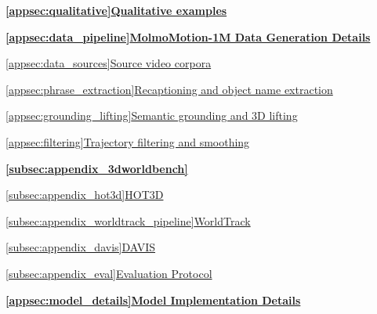 \begingroup
\hypersetup{hidelinks}
{\setlength{\parindent}{0pt}
\setlength{\parskip}{2pt}

\hyperref[appsec:qualitative]{\textbf{\ref*{appsec:qualitative}\quad Qualitative examples}}\dotfill\pageref{appsec:qualitative}


\hyperref[appsec:data_pipeline]{\textbf{\ref*{appsec:data_pipeline}\quad MolmoMotion-1M Data Generation Details}}\dotfill\pageref{appsec:data_pipeline}

\hspace*{2em}\hyperref[appsec:data_sources]{\ref*{appsec:data_sources}\quad Source video corpora}\dotfill\pageref{appsec:data_sources}

\hspace*{2em}\hyperref[appsec:phrase_extraction]{\ref*{appsec:phrase_extraction}\quad Recaptioning and object name extraction}\dotfill\pageref{appsec:phrase_extraction}

\hspace*{2em}\hyperref[appsec:grounding_lifting]{\ref*{appsec:grounding_lifting}\quad Semantic grounding and 3D lifting}\dotfill\pageref{appsec:grounding_lifting}

\hspace*{2em}\hyperref[appsec:filtering]{\ref*{appsec:filtering}\quad Trajectory filtering and smoothing}\dotfill\pageref{appsec:filtering}

\hyperref[subsec:appendix_3dworldbench]{\textbf{\ref*{subsec:appendix_3dworldbench}\quad \benchmarkname{}}}\dotfill\pageref{subsec:appendix_3dworldbench}

\hspace*{2em}\hyperref[subsec:appendix_hot3d]{\ref*{subsec:appendix_hot3d}\quad HOT3D}\dotfill\pageref{subsec:appendix_hot3d}

\hspace*{2em}\hyperref[subsec:appendix_worldtrack_pipeline]{\ref*{subsec:appendix_worldtrack_pipeline}\quad WorldTrack}\dotfill\pageref{subsec:appendix_worldtrack_pipeline}

\hspace*{2em}\hyperref[subsec:appendix_davis]{\ref*{subsec:appendix_davis}\quad DAVIS}\dotfill\pageref{subsec:appendix_davis}

\hspace*{2em}\hyperref[subsec:appendix_eval]{\ref*{subsec:appendix_eval}\quad Evaluation Protocol}\dotfill\pageref{subsec:appendix_eval}

\hyperref[appsec:model_details]{\textbf{\ref*{appsec:model_details}\quad Model Implementation Details}}\dotfill\pageref{appsec:model_details}

}
